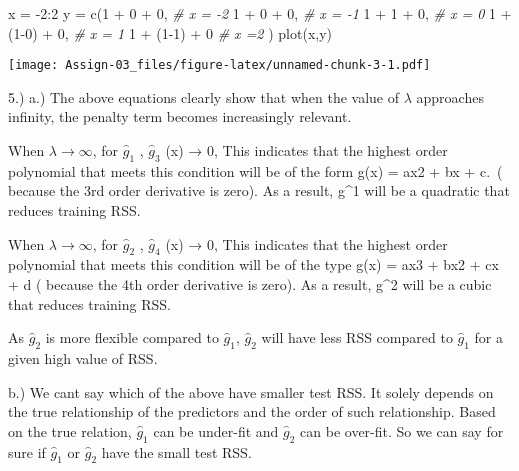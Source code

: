 \documentclass[
]{article}
\newenvironment{Shaded}{\begin{snugshade}}{\end{snugshade}}
\newcommand{\CommentTok}[1]{\textcolor[rgb]{0.56,0.35,0.01}{\textit{#1}}}
\newcommand{\DecValTok}[1]{\textcolor[rgb]{0.00,0.00,0.81}{#1}}
\newcommand{\FunctionTok}[1]{\textcolor[rgb]{0.00,0.00,0.00}{#1}}
\newcommand{\NormalTok}[1]{#1}
\newcommand{\OtherTok}[1]{\textcolor[rgb]{0.56,0.35,0.01}{#1}}
\newcommand{\SpecialCharTok}[1]{\textcolor[rgb]{0.00,0.00,0.00}{#1}}
\begin{document}
\begin{Shaded}
\begin{Highlighting}[]
\NormalTok{x }\OtherTok{=} \SpecialCharTok{{-}}\DecValTok{2}\SpecialCharTok{:}\DecValTok{2}
\NormalTok{y }\OtherTok{=} \FunctionTok{c}\NormalTok{(}\DecValTok{1} \SpecialCharTok{+} \DecValTok{0} \SpecialCharTok{+} \DecValTok{0}\NormalTok{, }\CommentTok{\# x = {-}2}
      \DecValTok{1} \SpecialCharTok{+} \DecValTok{0} \SpecialCharTok{+} \DecValTok{0}\NormalTok{, }\CommentTok{\# x = {-}1}
      \DecValTok{1} \SpecialCharTok{+} \DecValTok{1} \SpecialCharTok{+} \DecValTok{0}\NormalTok{, }\CommentTok{\# x = 0}
      \DecValTok{1} \SpecialCharTok{+}\NormalTok{ (}\DecValTok{1{-}0}\NormalTok{) }\SpecialCharTok{+} \DecValTok{0}\NormalTok{, }\CommentTok{\# x = 1}
      \DecValTok{1} \SpecialCharTok{+}\NormalTok{ (}\DecValTok{1{-}1}\NormalTok{) }\SpecialCharTok{+} \DecValTok{0} \CommentTok{\# x =2}
\NormalTok{      )}
\FunctionTok{plot}\NormalTok{(x,y)}
\end{Highlighting}
\end{Shaded}

\texttt{[image: Assign-03\_files/figure-latex/unnamed-chunk-3-1.pdf]}

5.) a.) The above equations clearly show that when the value of
\(\lambda\) approaches infinity, the penalty term becomes increasingly
relevant.

When \(\lambda → \infty\), for \(\hat{g}_1\) , \(\hat{g}_3\) (x) → 0,
This indicates that the highest order polynomial that meets this
condition will be of the form g(x) = ax2 + bx + c.~( because the 3rd
order derivative is zero). As a result, g\^{}1 will be a quadratic that
reduces training RSS.

When \(\lambda → \infty\), for \(\hat{g}_2\) , \(\hat{g}_4\) (x) → 0,
This indicates that the highest order polynomial that meets this
condition will be of the type g(x) = ax3 + bx2 + cx + d ( because the
4th order derivative is zero). As a result, g\^{}2 will be a cubic that
reduces training RSS.

As \(\hat{g}_2\) is more flexible compared to \(\hat{g}_1\),
\(\hat{g}_2\) will have less RSS compared to \(\hat{g}_1\) for a given
high value of RSS.

b.) We cant say which of the above have smaller test RSS. It solely
depends on the true relationship of the predictors and the order of such
relationship. Based on the true relation, \(\hat{g}_1\) can be under-fit
and \(\hat{g}_2\) can be over-fit. So we can say for sure if
\(\hat{g}_1\) or \(\hat{g}_2\) have the small test RSS.
\end{document}
